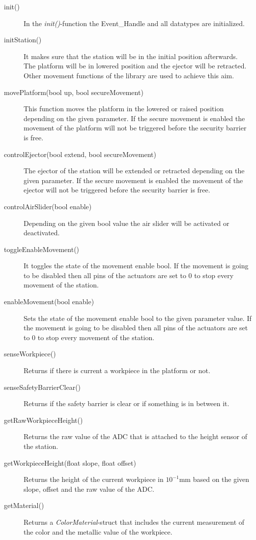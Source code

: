 \begin{description} 
	\item[init()] In the \textit{init()}-function the Event\_Handle and all datatypes are initialized. 
	\item[initStation()] It makes sure that the station will be in the initial position afterwards. The platform will be in lowered position and the ejector will be retracted. Other movement functions of the library are used to achieve this aim.
	\item[movePlatform(bool up, bool secureMovement)] This function moves the platform in the lowered or raised position depending on the given parameter. If the secure movement is enabled the movement of the platform will not be triggered before the security barrier is free. 
	\item[controlEjector(bool extend, bool secureMovement)] The ejector of the station will be extended or retracted depending on the given parameter. If the secure movement is enabled the movement of the ejector will not be triggered before the security barrier is free. 
	\item[controlAirSlider(bool enable)] Depending on the given bool value the air slider will be activated or deactivated.
	\item[toggleEnableMovement()] It toggles the state of the movement enable bool. If the movement is going to be disabled then all pins of the actuators are set to 0 to stop every movement of the station.
	\item[enableMovement(bool enable)] Sets the state of the movement enable bool to the given parameter value. If the movement is going to be disabled then all pins of the actuators are set to 0 to stop every movement of the station.
	\item[senseWorkpiece()] Returns if there is current a workpiece in the platform or not.
	\item[senseSafetyBarrierClear()] Returns if the safety barrier is clear or if something is in between it.
	\item[getRawWorkpieceHeight()] Returns the raw value of the ADC that is attached to the height sensor of the station. 
	\item[getWorkpieceHeight(float slope, float offset)] Returns the height of the current workpiece in $10^{-1}$mm based on the given slope, offset and the raw value of the ADC.
	\item[getMaterial()] Returns a \textit{ColorMaterial}-struct that includes the current measurement of the color and the metallic value of the workpiece.
\end{description}

